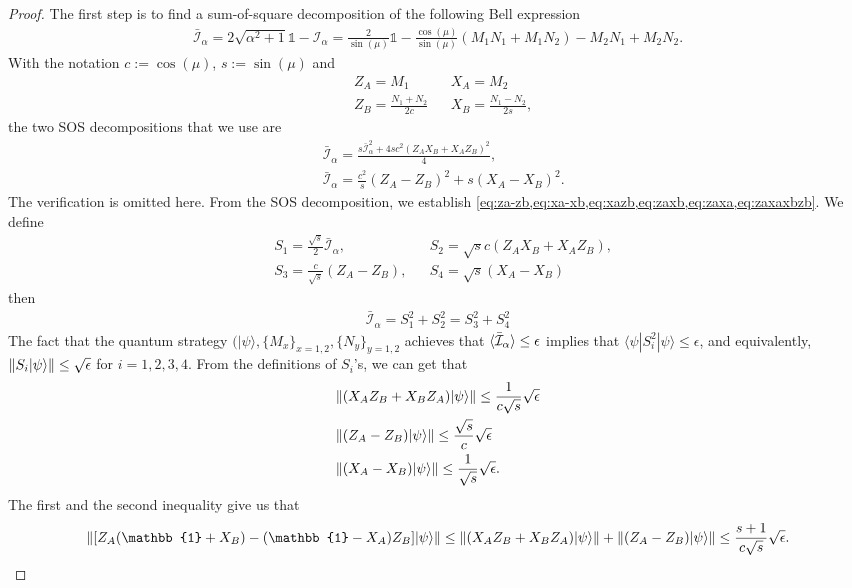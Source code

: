 \documentclass[11pt,letterpaper]{article}
\newcommand{\ket}[1]{|#1\rangle}
\newcommand{\bra}[1]{\langle#1|}
\DeclarePairedDelimiter{\norm}{\lVert}{\rVert}
\DeclarePairedDelimiter{\ip}{\langle}{\rangle}
\newcommand{\1}{\mathbb{1}}
\newcommand{\I}{\mathcal{I}}
\newcommand{\ep}{\epsilon}
\newcommand{\se}{\sqrt{\epsilon}}
\theoremstyle{definition}
\begin{document}
\begin{proof}
The first step is to find a sum-of-square decomposition of 
the following Bell expression
\begin{align}
	\bar{\I}_\alpha = 2\sqrt{\alpha^2+1} \1 - \I_\alpha
	= \frac{2}{\sin(\mu)} \1 - \frac{\cos(\mu)}{\sin(\mu)}(M_1N_1+M_1N_2) -  M_2N_1 + M_2N_2.
\end{align} 
With the notation $c:= \cos(\mu)$, $s := \sin(\mu)$ and 
\begin{align*}
	&Z_A = M_1 && X_A = M_2\\
	&Z_B = \frac{N_1+N_2}{2c} && X_B = \frac{N_1-N_2}{2s},
\end{align*}
the two SOS decompositions that we use are
\begin{align}
	\label{eq:sos1}&\bar{\I}_\alpha = \frac{s \bar{\I}_\alpha^2 + 4sc^2(Z_AX_B+X_AZ_B)^2}{4},\\
	\label{eq:sos2}&\bar{\I}_\alpha = \frac{c^2}{s}(Z_A-Z_B)^2 + s(X_A-X_B)^2.
\end{align}
The verification is omitted here. From the SOS decomposition, we establish \cref{eq:za-zb,eq:xa-xb,eq:xazb,eq:zaxb,eq:zaxa,eq:zaxaxbzb}.
We define
\begin{align*}
	&S_1 = \frac{\sqrt{s}}{2} \bar{\I}_\alpha, &&
	S_2 = \sqrt{s}c(Z_AX_B+ X_AZ_B),\\
	&S_3 = \frac{c}{\sqrt{s}}(Z_A-Z_B), &&
	S_4 = \sqrt{s}(X_A-X_B)
\end{align*}
then 
\begin{align}
\bar{\I}_\alpha = S_1^2 + S_2^2 = S_3^2 + S_4^2
\end{align}
The fact that the quantum strategy $(\ket{\psi}, \{M_x\}_{x=1,2}, \{N_{y }\}_{y=1,2}$ achieves that 
$\ip{\bar{\I}_\alpha} \leq \epsilon$ implies that
$\bra{\psi} S_i^2 \ket{\psi} \leq \ep$, and equivalently, $\norm{S_i \ket{\psi}} \leq \se$ for $i = 1,2,3,4$.
From the definitions of $S_i$'s, we can get that 
\begin{align}
	&\norm{(X_AZ_B+X_BZ_A)\ket{\psi}} \leq \frac{1}{c\sqrt{s}} \se\\
	&\norm{(Z_A-Z_B)\ket{\psi}} \leq \frac{\sqrt{s}}{c} \se\\
	&\norm{(X_A-X_B)\ket{\psi}} \leq \frac{1}{\sqrt{s}} \se.
\end{align}
The first and the second inequality give us that 
\begin{align}
	\norm{ [Z_A(\1+X_B) - (\1-X_A)Z_B] \ket{\psi} } 
	\leq \norm{(X_AZ_B+X_BZ_A)\ket{\psi}} + \norm{(Z_A-Z_B)\ket{\psi}}
	\leq \frac{s+1}{c\sqrt{s}} \se.
\end{align}

\end{proof}
\end{document}
